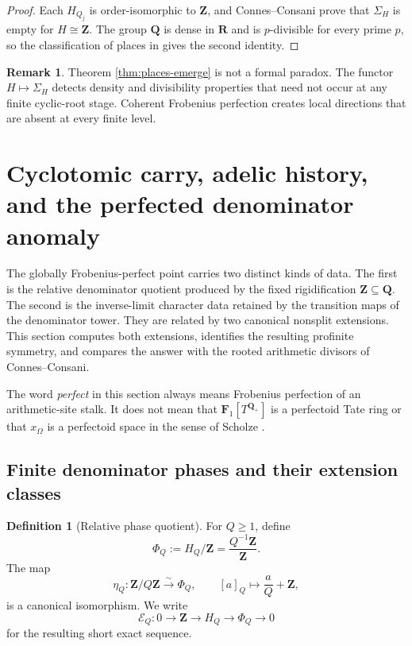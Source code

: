 \documentclass[11pt]{amsart}
\numberwithin{equation}{section}
\theoremstyle{definition}
\newtheorem{definition}[theorem]{Definition}
\newtheorem{remark}[theorem]{Remark}
\newcommand{\Z}{\mathbf Z}
\newcommand{\Q}{\mathbf Q}
\newcommand{\R}{\mathbf R}
\newcommand{\Fone}{\mathbf F_1}
\begin{document}
\begin{proof}
Each $H_{Q_j}$ is order-isomorphic to $\Z$, and Connes--Consani prove that
$\Sigma_H$ is empty for $H\cong\Z$.  The group $\Q$ is dense in $\R$ and
is $p$-divisible for every prime $p$, so the classification of places in
\cite{CCAbsolute} gives the second identity.
\end{proof}

\begin{remark}
Theorem \ref{thm:places-emerge} is not a formal paradox.  The functor
$H\mapsto\Sigma_H$ detects density and divisibility properties that need
not occur at any finite cyclic-root stage.  Coherent Frobenius perfection
creates local directions that are absent at every finite level.
\end{remark}

\section{Cyclotomic carry, adelic history, and the perfected denominator anomaly}
\label{sec:perfected-anomaly}

The globally Frobenius-perfect point carries two distinct kinds of data.
The first is the relative denominator quotient produced by the fixed
rigidification $\Z\subseteq\Q$.  The second is the inverse-limit character
data retained by the transition maps of the denominator tower.  They are
related by two canonical nonsplit extensions.  This section computes both
extensions, identifies the resulting profinite symmetry, and compares the
answer with the rooted arithmetic divisors of Connes--Consani.

The word \emph{perfect} in this section always means Frobenius perfection
of an arithmetic-site stalk.  It does not mean that
$\Fone[T^{\Q_+}]$ is a perfectoid Tate ring or that $x_\Omega$ is a
perfectoid space in the sense of Scholze \cite{ScholzePerfectoid}.

\subsection{Finite denominator phases and their extension classes}

\begin{definition}[Relative phase quotient]
\label{def:finite-phase-quotient}
For $Q\geq1$, define
\[
\Phi_Q:=H_Q/\Z=\frac{Q^{-1}\Z}{\Z}.
\]
The map
\[
\eta_Q:\Z/Q\Z\xrightarrow{\sim}\Phi_Q,
\qquad
[a]_Q\longmapsto \frac aQ+\Z,
\]
is a canonical isomorphism.  We write
\[
\mathcal E_Q:
0\longrightarrow\Z\longrightarrow H_Q
\longrightarrow\Phi_Q\longrightarrow0
\]
for the resulting short exact sequence.
\end{definition}
\end{document}
